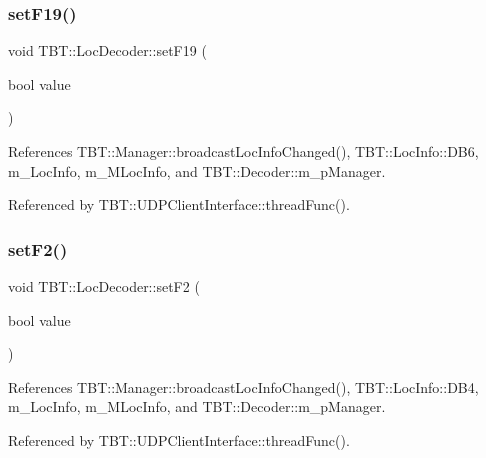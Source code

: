 \subsubsection{\texorpdfstring{set\+F19()}{setF19()}}
{\footnotesize\ttfamily void T\+B\+T\+::\+Loc\+Decoder\+::set\+F19 (\begin{DoxyParamCaption}\item[{bool}]{value }\end{DoxyParamCaption})\hspace{0.3cm}{\ttfamily [inline]}}



References T\+B\+T\+::\+Manager\+::broadcast\+Loc\+Info\+Changed(), T\+B\+T\+::\+Loc\+Info\+::\+D\+B6, m\+\_\+\+Loc\+Info, m\+\_\+\+M\+Loc\+Info, and T\+B\+T\+::\+Decoder\+::m\+\_\+p\+Manager.



Referenced by T\+B\+T\+::\+U\+D\+P\+Client\+Interface\+::thread\+Func().

\mbox{\label{classTBT_1_1LocDecoder_a60e4822d5d730abec02cf045353d5316_a60e4822d5d730abec02cf045353d5316}} 
\subsubsection{\texorpdfstring{set\+F2()}{setF2()}}
{\footnotesize\ttfamily void T\+B\+T\+::\+Loc\+Decoder\+::set\+F2 (\begin{DoxyParamCaption}\item[{bool}]{value }\end{DoxyParamCaption})\hspace{0.3cm}{\ttfamily [inline]}}



References T\+B\+T\+::\+Manager\+::broadcast\+Loc\+Info\+Changed(), T\+B\+T\+::\+Loc\+Info\+::\+D\+B4, m\+\_\+\+Loc\+Info, m\+\_\+\+M\+Loc\+Info, and T\+B\+T\+::\+Decoder\+::m\+\_\+p\+Manager.



Referenced by T\+B\+T\+::\+U\+D\+P\+Client\+Interface\+::thread\+Func().

\mbox{\label{classTBT_1_1LocDecoder_a04a0514ad5b63714ca5774cf3c2e277c_a04a0514ad5b63714ca5774cf3c2e277c}} 
